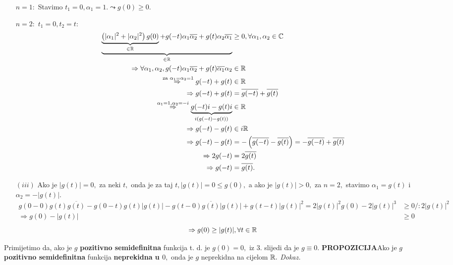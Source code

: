 \documentclass{article}
\begin{document}
\begin{enumerate}
    \item[\(n=1:\)] Stavimo \(t_1=0,\alpha_1=1.\leadsto g(0)\ge 0.\)
    \item[\(n=2:\)] \(t_1=0,t_2=t:\) \[\begin{aligned}\underbrace{\underbrace{\left(|\alpha_1|^2+|\alpha_2|^2\right)g(0)}_{\in\Bbb R}+g(-t)\alpha_1\overline{\alpha_2}+g(t)\alpha_2\overline{\alpha_1}}_{\in\Bbb R}&\ge 0,\forall\alpha_1,\alpha_2\in\Bbb C\\\Rightarrow\forall\alpha_1,\alpha_2, g(-t)\alpha_1\overline{\alpha_2}+g(t)\overline{\alpha_1}\alpha_2&\in\Bbb R\\\overset{\text{ za }\alpha_1=\alpha_2=1}{\Rightarrow}g(-t)+g(t)&\in\Bbb R\\\Rightarrow g(-t)+g(t)&=\overline{g(-t)}+\overline{g(t)}\\\overset{\alpha_1=1,\alpha_2=-i}{\Rightarrow}\underbrace{g(-t)i-g(t)i}_{i(g(-t)-g(t))}&\in\Bbb R\\\Rightarrow g(-t)-g(t)&\in i\Bbb R\\\Rightarrow g(-t)-g(t)&=-\left(\overline{g(-t)}-\overline{g(t)}\right)=-\overline{g(-t)}+\overline{g(t)}\\\Rightarrow 2g(-t)&=2\overline{g(t)}\\\Rightarrow g(-t)&=\overline{g(t)}.\end{aligned}\]
    \item[\((iii)\)] Ako je \(|g(t)|=0,\) za neki \(t,\) onda je za taj \(t, |g(t)|=0\le g(0),\) a ako je \(|g(t)|>0,\) za \(n=2,\) stavimo \(\alpha_1=g(t)\) i \(\alpha_2=-|g(t)|.\) \[\begin{aligned}g(0-0)g(t)\overline{g(t)}-g(0-t)g(t)|g(t)|-g(t-0)\overline{g(t)}|g(t)|+g(t-t)|g(t)|^2=2|g(t)|^2g(0)-2|g(t)|^3&\ge 0/:2|g(t)|^2\\\Rightarrow g(0)-|g(t)|&\ge 0\end{aligned}\]\[\Rightarrow g(0)\ge|g(t)|,\forall t\in\Bbb R\] 
\end{enumerate}
Primijetimo da, ako je \(g\) \textbf{pozitivno semidefinitna} funkcija t. d. je \(g(0)=0,\) iz \(3.\) slijedi da je \(g\equiv 0.\) \newline\newline
\textbf{PROPOZICIJA}\newline Ako je \(g\) \textbf{pozitivno semidefinitna} funkcija \textbf{neprekidna u \(0,\)} onda je \(g\) neprekidna na cijelom \(\Bbb R.\)\newline\newline
\textit{Dokaz.}\newline
\end{document}
